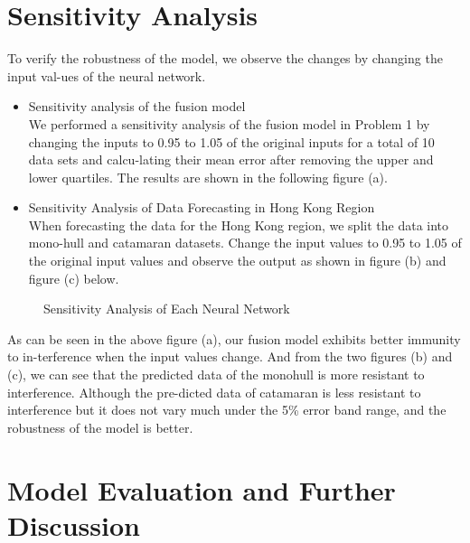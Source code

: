\section{Sensitivity Analysis}
To verify the robustness of the model, we observe the changes by changing the input val-ues of the neural network.

\begin{itemize}
    \setlength{\parsep}{0ex} %
    \setlength{\topsep}{2ex} %
    \setlength{\itemsep}{1ex} %
    \item Sensitivity analysis of the fusion model\\
    We performed a sensitivity analysis of the fusion model in Problem 1 by changing the inputs to 0.95 to 1.05 of the original inputs for a total of 10 data sets and calcu-lating their mean error after removing the upper and lower quartiles. The results are shown in the following figure (a).
    \item Sensitivity Analysis of Data Forecasting in Hong Kong Region\\
    When forecasting the data for the Hong Kong region, we split the data into mono-hull and catamaran datasets. Change the input values to 0.95 to 1.05 of the original input values and observe the output as shown in figure (b) and figure (c) below.
\end{itemize}

\begin{figure}[H]
    \centering    
	\caption{Sensitivity Analysis of Each Neural Network} %
    \vspace{-0.5cm}
\end{figure}

As can be seen in the above figure (a), our fusion model exhibits better immunity to in-terference when the input values change. And from the two figures (b) and (c), we can see that the predicted data of the monohull is more resistant to interference. Although the pre-dicted data of catamaran is less resistant to interference but it does not vary much under the 5\% error band range, and the robustness of the model is better.

\section{Model Evaluation and Further Discussion}
